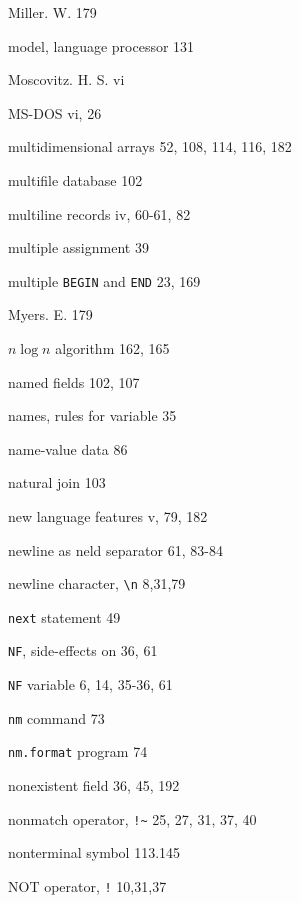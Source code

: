 \begin{multicols}{3}
\hangindent=3pc  Miller. W. 179

\hangindent=3pc  model, language processor 131

\hangindent=3pc  Moscovitz. H. S. vi

\hangindent=3pc  MS-DOS vi, 26

\hangindent=3pc  multidimensional arrays 52, 108, 114, 116, 182

\hangindent=3pc  multifile database 102

\hangindent=3pc  multiline records iv, 60-61, 82

\hangindent=3pc  multiple assignment 39

\hangindent=3pc  multiple \verb'BEGIN' and \verb'END' 23, 169

\hangindent=3pc  Myers. E. 179

\hangindent=3pc  $n \log n$ algorithm 162, 165

\hangindent=3pc  named fields 102, 107

\hangindent=3pc  names, rules for variable 35

\hangindent=3pc  name-value data 86

\hangindent=3pc  natural join 103

\hangindent=3pc  new language features v, 79, 182

\hangindent=3pc  newline as neld separator 61,  83-84

\hangindent=3pc  newline character, \verb'\n' 8,31,79

\hangindent=3pc  \verb'next' statement 49

\hangindent=3pc  \verb'NF', side-effects on 36, 61

\hangindent=3pc  \verb'NF' variable 6, 14, 35-36, 61

\hangindent=3pc  \verb'nm' command 73

\hangindent=3pc  \verb'nm.format' program 74


\hangindent=3pc  nonexistent field 36, 45, 192

\hangindent=3pc  nonmatch operator, \verb'!~' 25, 27, 31, 37, 40

\hangindent=3pc  nonterminal symbol 113.145

\hangindent=3pc  NOT operator, \verb'!' 10,31,37


\end{multicols}
